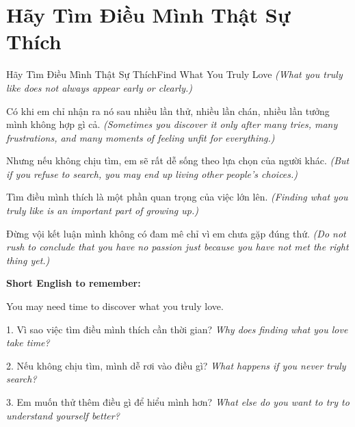 \section{Hãy Tìm Điều Mình Thật Sự Thích}
\begin{truyen}{Hãy Tìm Điều Mình Thật Sự Thích}{Find What You Truly Love}
\textit{(What you truly like does not always appear early or clearly.)}

Có khi em chỉ nhận ra nó sau nhiều lần thử, nhiều lần chán, nhiều lần tưởng mình không hợp gì cả.
\textit{(Sometimes you discover it only after many tries, many frustrations, and many moments of feeling unfit for everything.)}

Nhưng nếu không chịu tìm, em sẽ rất dễ sống theo lựa chọn của người khác.
\textit{(But if you refuse to search, you may end up living other people's choices.)}

Tìm điều mình thích là một phần quan trọng của việc lớn lên.
\textit{(Finding what you truly like is an important part of growing up.)}
\end{truyen}

\begin{baihoc}
Đừng vội kết luận mình không có đam mê chỉ vì em chưa gặp đúng thứ.
\textit{(Do not rush to conclude that you have no passion just because you have not met the right thing yet.)}
\end{baihoc}

\begin{ghinhoanh}
\textbf{Short English to remember:}

You may need time to discover what you truly love.

\end{ghinhoanh}

\begin{tuhocnhanh}
1. Vì sao việc tìm điều mình thích cần thời gian? \textit{Why does finding what you love take time?}

2. Nếu không chịu tìm, mình dễ rơi vào điều gì? \textit{What happens if you never truly search?}

3. Em muốn thử thêm điều gì để hiểu mình hơn? \textit{What else do you want to try to understand yourself better?}
\end{tuhocnhanh}
\ngancach

